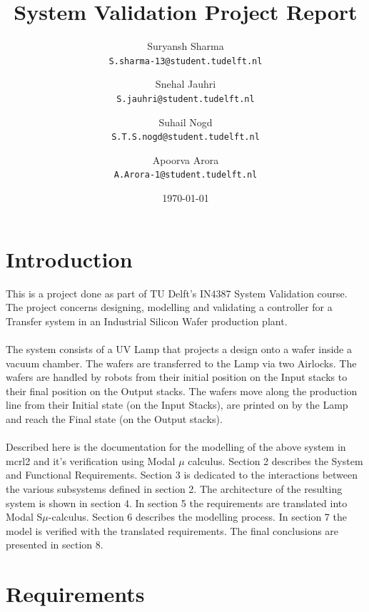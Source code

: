 \documentclass[a4paper,12pt]{article}
\begin{document}
\title{System Validation Project Report}
\author{
	Suryansh Sharma \\ 
	\texttt{S.sharma-13@student.tudelft.nl}
 	\and 
	Snehal Jauhri \\
	\texttt{S.jauhri@student.tudelft.nl} 
	\and
	Suhail Nogd \\
	\texttt{S.T.S.nogd@student.tudelft.nl} 	
	 \and 
	Apoorva Arora\\
	\texttt{A.Arora-1@student.tudelft.nl} 
}

\date {\today}
\maketitle
\newpage
\tableofcontents
 
\newpage
\section{Introduction}
This is a project done as part of TU Delft's IN4387 System Validation course. The project concerns designing, modelling and validating a controller for a Transfer system in an Industrial Silicon Wafer production plant.
\\
\\The system consists of a UV Lamp that projects a design onto a wafer inside a vacuum chamber. The wafers are transferred to the Lamp via two Airlocks. The wafers are handled by robots from their initial position on the Input stacks to their final position on the Output stacks. The wafers move along the production line from their Initial state (on the Input Stacks), are printed on by the Lamp and reach the Final state (on the Output stacks).
\\
\\Described here is the documentation for the modelling of the above system in mcrl2 and it's verification using Modal $\mu$ calculus. Section 2 describes the System and Functional Requirements. Section 3 is dedicated to the interactions between the various subsystems defined in section 2. The architecture of the resulting system is shown in section 4. In section 5 the requirements are translated into Modal S$\mu$-calculus. Section 6 describes the modelling process. In section 7 the model is verified with the translated requirements. The final conclusions are presented in section 8.

\section{Requirements}
\end{document}
